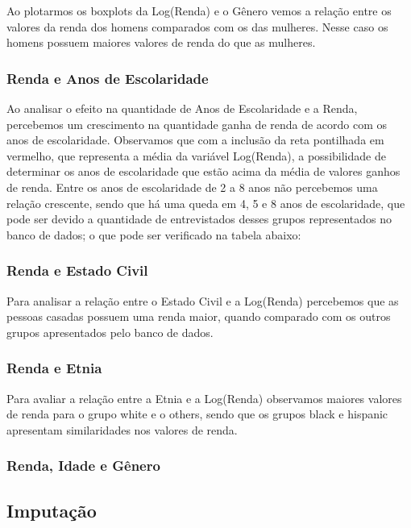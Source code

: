 \documentclass[]{article}
\begin{document}
Ao plotarmos os boxplots da Log(Renda) e o Gênero vemos a relação entre
os valores da renda dos homens comparados com os das mulheres. Nesse
caso os homens possuem maiores valores de renda do que as mulheres.

\subsubsection{Renda e Anos de
Escolaridade}\label{renda-e-anos-de-escolaridade}

Ao analisar o efeito na quantidade de Anos de Escolaridade e a Renda,
percebemos um crescimento na quantidade ganha de renda de acordo com os
anos de escolaridade. Observamos que com a inclusão da reta pontilhada
em vermelho, que representa a média da variável Log(Renda), a
possibilidade de determinar os anos de escolaridade que estão acima da
média de valores ganhos de renda. Entre os anos de escolaridade de 2 a 8
anos não percebemos uma relação crescente, sendo que há uma queda em 4,
5 e 8 anos de escolaridade, que pode ser devido a quantidade de
entrevistados desses grupos representados no banco de dados; o que pode
ser verificado na tabela abaixo:

\subsubsection{Renda e Estado Civil}\label{renda-e-estado-civil}

Para analisar a relação entre o Estado Civil e a Log(Renda) percebemos
que as pessoas casadas possuem uma renda maior, quando comparado com os
outros grupos apresentados pelo banco de dados.

\subsubsection{Renda e Etnia}\label{renda-e-etnia}

Para avaliar a relação entre a Etnia e a Log(Renda) observamos maiores
valores de renda para o grupo white e o others, sendo que os grupos
black e hispanic apresentam similaridades nos valores de renda.

\subsubsection{Renda, Idade e Gênero}\label{renda-idade-e-genero}

\subsection{Imputação}\label{imputacao}
\end{document}
